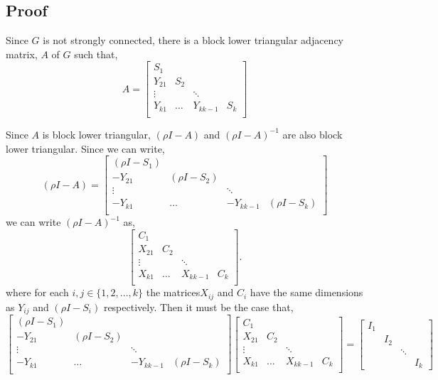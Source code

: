 \documentclass{paper}
\begin{document}
\subsection*{Proof}

Since $G$ is not strongly connected, there is a block lower triangular adjacency matrix, $A$ of $G$ such that,
\[
A = 
\begin{bmatrix}
S_1 \\
Y_{21} & S_2 \\
\vdots & & \ddots \\
Y_{k1} & \hdots & Y_{kk-1} & S_k \\
\end{bmatrix}
\]

 Since $A$ is block lower triangular, $(\rho I -A)$ and $(\rho I - A)^{-1}$ are also block lower triangular. Since we can write,
\[
(\rho I - A)
=
\begin{bmatrix}
(\rho I - S_1) \\
-Y_{21} & (\rho I - S_2) \\
\vdots & & \ddots \\
-Y_{k1} & \hdots & -Y_{kk-1} & (\rho I - S_k) \\
\end{bmatrix}
\]
we can write $(\rho I - A)^{-1}$ as,
\[
\begin{bmatrix}
C_1 \\
X_{21} & C_2\\
\vdots &  & \ddots  \\
X_{k1} & \hdots & X_{kk-1} & C_k \\
\end{bmatrix}.
\]
where for each $i,j \in \{1,2,...,k\}$ the matrices$X_{ij}$ and $C_i$ have the same dimensions as $Y_{ij}$ and $(\rho I - S_i)$ respectively. Then it must be the case that,
\[
\begin{bmatrix}
(\rho I - S_1) \\
-Y_{21} & (\rho I - S_2) \\
\vdots & & \ddots \\
-Y_{k1} & \hdots & -Y_{kk-1} & (\rho I - S_k) \\
\end{bmatrix}
\begin{bmatrix}
C_1 \\
X_{21} & C_2\\
\vdots &  & \ddots  \\
X_{k1} & \hdots & X_{kk-1} & C_k \\
\end{bmatrix}
=
\begin{bmatrix}
I_1 \\
& I_2 \\
& & \ddots \\
& & & I_k
\end{bmatrix}
\]
\end{document}
